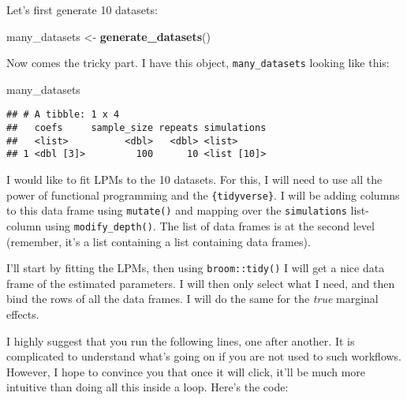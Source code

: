 \documentclass[
]{article}
\newenvironment{Shaded}{\begin{snugshade}}{\end{snugshade}}
\newcommand{\KeywordTok}[1]{\textcolor[rgb]{0.13,0.29,0.53}{\textbf{#1}}}
\newcommand{\NormalTok}[1]{#1}
\newcommand{\StringTok}[1]{\textcolor[rgb]{0.31,0.60,0.02}{#1}}
\begin{document}
Let's first generate 10 datasets:

\begin{Shaded}
\begin{Highlighting}[]
\NormalTok{many\_datasets \textless{}{-}}\StringTok{ }\KeywordTok{generate\_datasets}\NormalTok{()}
\end{Highlighting}
\end{Shaded}

Now comes the tricky part. I have this object, \texttt{many\_datasets} looking like this:

\begin{Shaded}
\begin{Highlighting}[]
\NormalTok{many\_datasets}
\end{Highlighting}
\end{Shaded}

\begin{verbatim}
## # A tibble: 1 x 4
##   coefs     sample_size repeats simulations
##   <list>          <dbl>   <dbl> <list>     
## 1 <dbl [3]>         100      10 <list [10]>
\end{verbatim}

I would like to fit LPMs to the 10 datasets. For this, I will need to use all the power of functional
programming and the \texttt{\{tidyverse\}}. I will be adding columns to this data frame using \texttt{mutate()}
and mapping over the \texttt{simulations} list-column using \texttt{modify\_depth()}. The list of data frames is
at the second level (remember, it's a list containing a list containing data frames).

I'll start by fitting the LPMs, then using \texttt{broom::tidy()} I will get a nice data frame of the
estimated parameters. I will then only select what I need, and then bind the rows of all the
data frames. I will do the same for the \emph{true} marginal effects.

I highly suggest that you run the following lines, one after another. It is complicated to understand
what's going on if you are not used to such workflows. However, I hope to convince you that once
it will click, it'll be much more intuitive than doing all this inside a loop. Here's the code:
\end{document}
